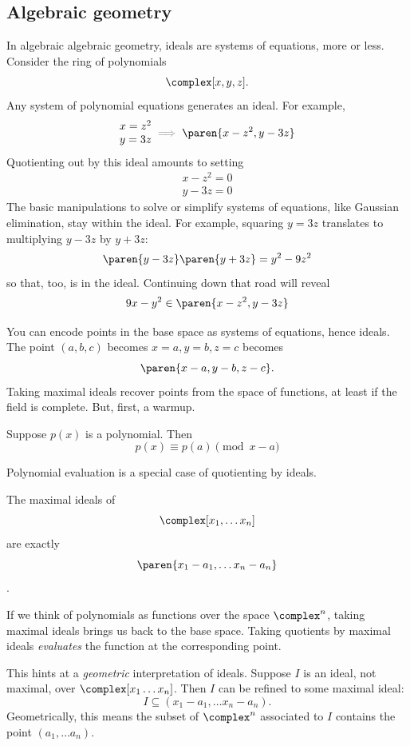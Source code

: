 \documentclass[a5paper]{scrartcl}
\let\oldimplies\implies
\def\implies{\color{gray}\oldimplies\color{black}}
\begin{document}
\subsection{Algebraic geometry}
In algebraic algebraic geometry, ideals are systems of equations, more or less. Consider the ring of polynomials
\[
  \complex[x,y,z].
\]
Any system of polynomial equations generates an ideal. For example,
\[
  \begin{matrix}
    x = z^2 \\
    y = 3z
  \end{matrix}
  \implies
  \paren{x-z^2, y-3z}
\]
Quotienting out by this ideal amounts to setting
\[
  \begin{matrix}
    x-z^2 = 0 \\
    y-3z = 0
  \end{matrix}
\]
The basic manipulations to solve or simplify systems of equations, like Gaussian elimination, stay within the ideal. For example, squaring \(y=3z\) translates to multiplying \(y-3z\) by \(y+3z\):
\[
  \paren{y-3z}\paren{y+3z} = y^2-9z^2
\]
so that, too, is in the ideal. Continuing down that road will reveal
\[
  9x - y^2 \in \paren{x-z^2, y-3z}
\]

You can encode points in the base space as systems of equations, hence ideals. The point \((a,b,c)\) becomes \(x=a,y=b,z=c\) becomes
\[
  \paren{x-a,y-b,z-c}.
\]
Taking maximal ideals recover points from the space of functions, at least if the field is complete. But, first, a warmup.
\begin{theorem}
  Suppose \(p(x)\) is a polynomial. Then
  \[
    p(x) \equiv p(a) \pmod {x-a}
  \]
\end{theorem}
Polynomial evaluation is a special case of quotienting by ideals.

\begin{theorem}
  The maximal ideals of
  \[
    \complex[x_1,\dots x_n]
  \]
  are exactly
  \[
    \paren{x_1-a_1,\dots x_n-a_n}
  \]
  \cite[107]{rising-sea2024}.
\end{theorem}
If we think of polynomials as functions over the space \(\complex^n\), taking maximal ideals brings us back to the base space. Taking quotients by maximal ideals \emph{evaluates} the function at the corresponding point.

This hints at a \emph{geometric} interpretation of ideals. Suppose \(I\) is an ideal, not maximal, over \(\complex[x_1\dots x_n]\). Then \(I\) can be refined to some maximal ideal:
\[
  I\subseteq (x_1-a_1,\dots x_n-a_n).
\]
Geometrically, this means the subset of \(\complex^n\) associated to \(I\) contains the point \((a_1,\dots a_n)\).
\end{document}
